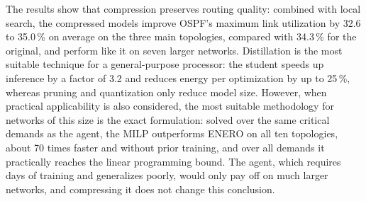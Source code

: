 The results show that compression preserves routing quality: combined with local search, the compressed models improve OSPF's maximum link utilization by 32.6 to 35.0\,\% on average on the three main topologies, compared with 34.3\,\% for the original, and perform like it on seven larger networks. Distillation is the most suitable technique for a general-purpose processor: the student speeds up inference by a factor of 3.2 and reduces energy per optimization by up to 25\,\%, whereas pruning and quantization only reduce model size. However, when practical applicability is also considered, the most suitable methodology for networks of this size is the exact formulation: solved over the same critical demands as the agent, the MILP outperforms ENERO on all ten topologies, about 70 times faster and without prior training, and over all demands it practically reaches the linear programming bound. The agent, which requires days of training and generalizes poorly, would only pay off on much larger networks, and compressing it does not change this conclusion.


